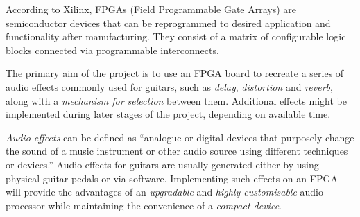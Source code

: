 According to Xilinx, FPGAs (Field Programmable Gate Arrays)\cite{whatisanfpga} are semiconductor devices that can be reprogrammed to desired application and functionality after manufacturing. They consist of a matrix of configurable logic blocks connected via programmable interconnects.

The primary aim of the project is to use an FPGA board to recreate a series of audio effects commonly used for guitars, such as \textit{delay}, \textit{distortion} and \textit{reverb}, along with a \textit{mechanism for selection} between them. Additional effects might be implemented during later stages of the project, depending on available time. 

\textit{Audio effects} can be defined as ``analogue or digital devices that purposely change the sound of a music instrument or other audio source using different techniques or devices.''\cite{audio-effects} Audio effects for guitars are usually generated either by using physical guitar pedals or via software. Implementing such effects on an FPGA will provide the advantages of an \textit{upgradable} and \textit{highly customisable} audio processor while maintaining the convenience of a \textit{compact device}.